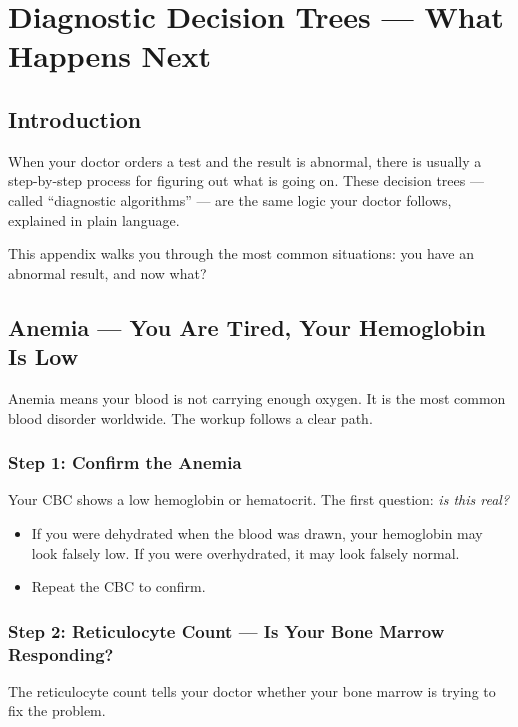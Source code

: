 \chapter{Diagnostic Decision Trees --- What Happens Next}
\label{app:algorithms}

\clearpage
\section{Introduction}

When your doctor orders a test and the result is abnormal, there is usually a step-by-step process for figuring out what is going on. These decision trees --- called ``diagnostic algorithms'' --- are the same logic your doctor follows, explained in plain language.

This appendix walks you through the most common situations: you have an abnormal result, and now what?

\clearpage
\section{Anemia --- You Are Tired, Your Hemoglobin Is Low}

Anemia means your blood is not carrying enough oxygen. It is the most common blood disorder worldwide. The workup follows a clear path.

\subsection{Step 1: Confirm the Anemia}

Your CBC shows a low hemoglobin or hematocrit. The first question: \emph{is this real?}

\begin{itemize}
    \item If you were dehydrated when the blood was drawn, your hemoglobin may look falsely low. If you were overhydrated, it may look falsely normal.
    \item Repeat the CBC to confirm.
\end{itemize}

\subsection{Step 2: Reticulocyte Count --- Is Your Bone Marrow Responding?}

The reticulocyte count tells your doctor whether your bone marrow is trying to fix the problem.

